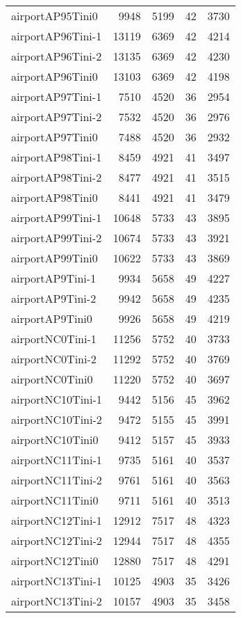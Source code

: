 \begin{longtable}{lrrrr}
airportAP95Tini0 & 9948 & 5199 & 42 & 3730 \\
airportAP96Tini-1 & 13119 & 6369 & 42 & 4214 \\
airportAP96Tini-2 & 13135 & 6369 & 42 & 4230 \\
airportAP96Tini0 & 13103 & 6369 & 42 & 4198 \\
airportAP97Tini-1 & 7510 & 4520 & 36 & 2954 \\
airportAP97Tini-2 & 7532 & 4520 & 36 & 2976 \\
airportAP97Tini0 & 7488 & 4520 & 36 & 2932 \\
airportAP98Tini-1 & 8459 & 4921 & 41 & 3497 \\
airportAP98Tini-2 & 8477 & 4921 & 41 & 3515 \\
airportAP98Tini0 & 8441 & 4921 & 41 & 3479 \\
airportAP99Tini-1 & 10648 & 5733 & 43 & 3895 \\
airportAP99Tini-2 & 10674 & 5733 & 43 & 3921 \\
airportAP99Tini0 & 10622 & 5733 & 43 & 3869 \\
airportAP9Tini-1 & 9934 & 5658 & 49 & 4227 \\
airportAP9Tini-2 & 9942 & 5658 & 49 & 4235 \\
airportAP9Tini0 & 9926 & 5658 & 49 & 4219 \\
airportNC0Tini-1 & 11256 & 5752 & 40 & 3733 \\
airportNC0Tini-2 & 11292 & 5752 & 40 & 3769 \\
airportNC0Tini0 & 11220 & 5752 & 40 & 3697 \\
airportNC10Tini-1 & 9442 & 5156 & 45 & 3962 \\
airportNC10Tini-2 & 9472 & 5155 & 45 & 3991 \\
airportNC10Tini0 & 9412 & 5157 & 45 & 3933 \\
airportNC11Tini-1 & 9735 & 5161 & 40 & 3537 \\
airportNC11Tini-2 & 9761 & 5161 & 40 & 3563 \\
airportNC11Tini0 & 9711 & 5161 & 40 & 3513 \\
airportNC12Tini-1 & 12912 & 7517 & 48 & 4323 \\
airportNC12Tini-2 & 12944 & 7517 & 48 & 4355 \\
airportNC12Tini0 & 12880 & 7517 & 48 & 4291 \\
airportNC13Tini-1 & 10125 & 4903 & 35 & 3426 \\
airportNC13Tini-2 & 10157 & 4903 & 35 & 3458 \\

\end{longtable}
